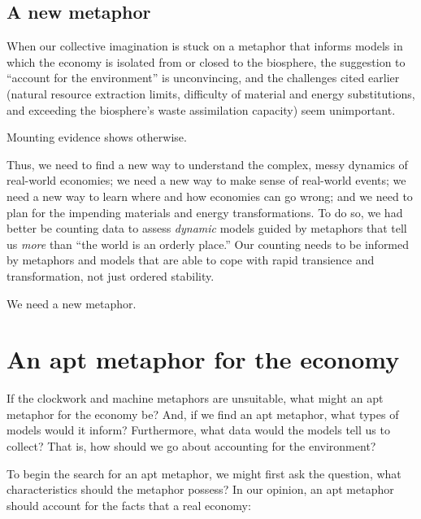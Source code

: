 \subsection{A new metaphor}
\label{sec:new_metaphor}

When our collective imagination is stuck on a metaphor that 
informs models in which the economy is isolated from or closed to the biosphere,
the suggestion to ``account for the environment'' is unconvincing, and 
the challenges cited earlier (natural resource extraction limits,
difficulty of material and energy substitutions, and 
exceeding the biosphere's waste assimilation capacity)
seem unimportant. 

Mounting evidence shows otherwise.

Thus, we need to find a new way to understand the complex, 
messy dynamics of real-world economies;
we need a new way to make sense of real-world events;
we need a new way to learn where and how economies can go wrong; and
we need to plan for the impending materials and energy transformations.
To do so, we had better be counting data to assess \emph{dynamic} models
guided by metaphors that tell us \emph{more} than ``the world is an orderly place.''
Our counting needs to be informed by metaphors and models that are
able to cope with rapid transience and transformation,
not just ordered stability.

We need a new metaphor.


\section{An apt metaphor for the economy}
\label{sec:apt_metaphor}

If the clockwork and machine metaphors are unsuitable, 
what might an apt metaphor for the economy be?
And, if we find an apt metaphor, what types of models would it inform?
Furthermore, what data would the models tell us to collect?
That is, how should we go about accounting for the environment?

To begin the search for an apt metaphor, 
we might first ask the question, 
what characteristics should the metaphor possess?
In our opinion, an apt metaphor should account for the facts 
that a real economy:

